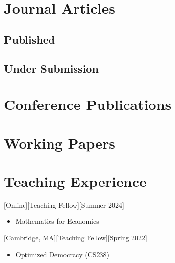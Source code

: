 \documentclass{article}
\begin{document}
	\section{Journal Articles}
	
	\subsection{Published}
	\vspace{-.3em}
	
    \begin{etaremune}
    [itemsep=0.2ex,
    	leftmargin=3.5ex]
        
    \end{etaremune}
    
    
    \subsection{Under Submission}
    \vspace{-.3em}
    \begin{etaremune}
    [itemsep=0.2ex,
    	leftmargin=3.5ex]
        
    \end{etaremune}
    


    \section{Conference Publications}
    \begin{etaremune}
    	[itemsep=0.2ex,
    	leftmargin=3.5ex]
        
    \end{etaremune}
    
    \section{Working Papers}
    \begin{etaremune}
    	[itemsep=0.2ex,
    	leftmargin=3.5ex]
        
    \end{etaremune}
    

    
    \section{Teaching Experience}
    [Online][Teaching Fellow][Summer 2024]
    \begin{itemize}
    	\item Mathematics for Economics
    \end{itemize}
    [Cambridge, MA][Teaching Fellow][Spring 2022]
    \begin{itemize}
        \item Optimized Democracy (CS238)
    \end{itemize}
    
\end{document}
